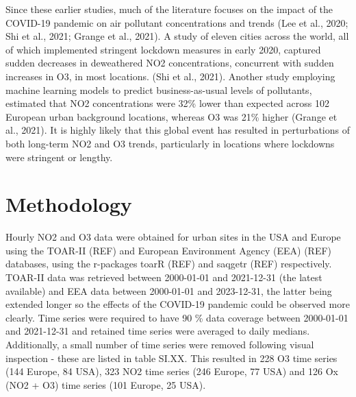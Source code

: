 \documentclass[journal abbreviation, manuscript]{copernicus}
\begin{document}
Since these earlier studies, much of the literature focuses on the impact of the COVID-19 pandemic on air pollutant concentrations and trends (Lee et al., 2020; Shi et al., 2021; Grange et al., 2021). A study of eleven cities across the world, all of which implemented stringent lockdown measures in early 2020, captured sudden decreases in deweathered NO2 concentrations, concurrent with sudden increases in O3, in most locations. (Shi et al., 2021). Another study employing machine learning models to predict business-as-usual levels of pollutants, estimated that NO2 concentrations were 32\% lower than expected across 102 European urban background locations, whereas O3 was 21\% higher (Grange et al., 2021). It is highly likely that this global event has resulted in perturbations of both long-term NO2 and O3 trends, particularly in locations where lockdowns were stringent or lengthy.



\section{Methodology}
Hourly NO2 and O3 data were obtained for urban sites in the USA and Europe using the TOAR-II (REF) and European Environment Agency (EEA) (REF) databases, using the r-packages toarR (REF) and saqgetr (REF) respectively. TOAR-II data was retrieved between 2000-01-01 and 2021-12-31 (the latest available) and EEA data between 2000-01-01 and 2023-12-31, the latter being extended longer so the effects of the COVID-19 pandemic could be observed more clearly. Time series were required to have 90 \% data coverage between 2000-01-01 and 2021-12-31 and retained time series were averaged to daily medians. Additionally, a small number of time series were removed following visual inspection - these are listed in table SI.XX. This resulted in 228 O3 time series (144 Europe, 84 USA), 323 NO2 time series (246 Europe, 77 USA) and 126 Ox (NO2 + O3) time series (101 Europe, 25 USA).
\end{document}
